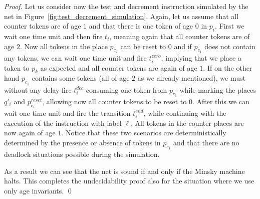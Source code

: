 \begin{proof}
Let us consider now the test and decrement instruction simulated by
the net in Figure~\ref{fig:test_decrement_simulation}. Again, let us assume
that all counter tokens are of age $1$ and that there is one token
of age $0$ in $p_i$. First we wait one time unit and then fire $t_i$,
meaning again that all counter tokens are of age $2$. Now all
tokens in the place $p_{c_2}$ can be reset to $0$ and if $p_{c_1}$
does not contain any tokens, we can wait one time unit and fire
$t_i^{\mathit zero}$, implying that we place a token to $p_k$
as expected and all counter tokens are again of age $1$.
If on the other hand $p_{c_1}$ contains some tokens (all of age $2$
as we already mentioned), we must without any delay fire
$t_i^{\mathit dec}$ consuming one token from $p_{c_1}$ while marking
the places $q'_i$ and $p^{\mathit reset}_{c_1}$, allowing
now all counter tokens to be reset to $0$. After this we can wait
one time unit and fire the transition $t_i^{\mathit end}$, while
continuing with the execution of the instruction with label $\ell$.
All tokens in the counter places are now again of age $1$.
Notice that these two scenarios are deterministically determined
by the presence or absence of tokens in $p_{c_1}$ and that there are
no deadlock situations possible during the simulation.

As a result
we can see that the net is sound if and only if
the Minsky machine halts. This completes the undecidability proof
also for the situation where we use only age invariants.
\qed
\end{proof}

